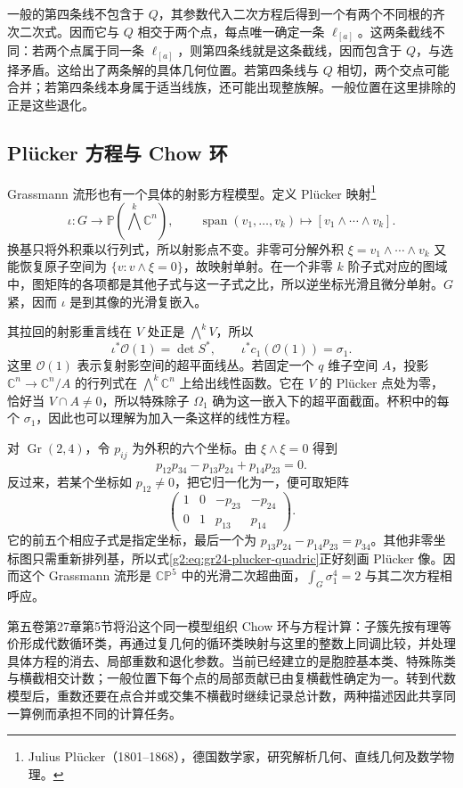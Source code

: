 \ProseParagraphBreak

一般的第四条线不包含于 \(Q\)，其参数代入二次方程后得到一个有两个不同根的齐次二次式。因而它与 \(Q\) 相交于两个点，每点唯一确定一条 \(\ell_{[a]}\)。这两条截线不同：若两个点属于同一条 \(\ell_{[a]}\)，则第四条线就是这条截线，因而包含于 \(Q\)，与选择矛盾。这给出了两条解的具体几何位置。若第四条线与 \(Q\) 相切，两个交点可能合并；若第四条线本身属于适当线族，还可能出现整族解。一般位置在这里排除的正是这些退化。

\subsection{Plücker 方程与 Chow 环}
\label{g2:subsec:2105:06}
Grassmann 流形也有一个具体的射影方程模型。定义 Pl\"ucker 映射\footnote{Julius Pl\"ucker（1801--1868），德国数学家，研究解析几何、直线几何及数学物理。}
\[
	\iota:G\longrightarrow\mathbb P(\textstyle\bigwedge^k\mathbb C^n),
	\qquad\operatorname{span}(v_1,\ldots,v_k)\longmapsto[v_1\wedge\cdots\wedge v_k].
\]
换基只将外积乘以行列式，所以射影点不变。非零可分解外积 \(\xi=v_1\wedge\cdots\wedge v_k\) 又能恢复原子空间为 \(\{v:v\wedge\xi=0\}\)，故映射单射。在一个非零 \(k\) 阶子式对应的图域中，图矩阵的各项都是其他子式与这一子式之比，所以逆坐标光滑且微分单射。\(G\) 紧，因而 \(\iota\) 是到其像的光滑复嵌入。

\ProseParagraphBreak

其拉回的射影重言线在 \(V\) 处正是 \(\bigwedge^kV\)，所以
\[
	\iota^*\mathcal O(1)=\det S^*,\qquad\iota^*c_1(\mathcal O(1))=\sigma_1.
\]
这里 \(\mathcal O(1)\) 表示复射影空间的超平面线丛。若固定一个 \(q\) 维子空间 \(A\)，投影 \(\mathbb C^n\to\mathbb C^n/A\) 的行列式在 \(\bigwedge^k\mathbb C^n\) 上给出线性函数。它在 \(V\) 的 Pl\"ucker 点处为零，恰好当 \(V\cap A\ne0\)，所以特殊除子 \(\Omega_1\) 确为这一嵌入下的超平面截面。杯积中的每个 \(\sigma_1\)，因此也可以理解为加入一条这样的线性方程。

\ProseParagraphBreak

对 \(\operatorname{Gr}(2,4)\)，令 \(p_{ij}\) 为外积的六个坐标。由 \(\xi\wedge\xi=0\) 得到
\begin{equation}\label{g2:eq:gr24-plucker-quadric}
	p_{12}p_{34}-p_{13}p_{24}+p_{14}p_{23}=0.
\end{equation}
反过来，若某个坐标如 \(p_{12}\ne0\)，把它归一化为一，便可取矩阵
\[
	\begin{pmatrix}
		1&0&-p_{23}&-p_{24}\\
		0&1&p_{13}&p_{14}
	\end{pmatrix}.
\]
它的前五个相应子式是指定坐标，最后一个为 \(p_{13}p_{24}-p_{14}p_{23}=p_{34}\)。其他非零坐标图只需重新排列基，所以式\eqref{g2:eq:gr24-plucker-quadric}正好刻画 Pl\"ucker 像。因而这个 Grassmann 流形是 \(\mathbb{CP}^5\) 中的光滑二次超曲面，\(\int_G\sigma_1^4=2\) 与其二次方程相呼应。

第五卷第27章第5节将沿这个同一模型组织 Chow 环与方程计算：子簇先按有理等价形成代数循环类，再通过复几何的循环类映射与这里的整数上同调比较，并处理具体方程的消去、局部重数和退化参数。当前已经建立的是胞腔基本类、特殊陈类与横截相交计数；一般位置下每个点的局部贡献已由复横截性确定为一。转到代数模型后，重数还要在点合并或交集不横截时继续记录总计数，两种描述因此共享同一算例而承担不同的计算任务。
